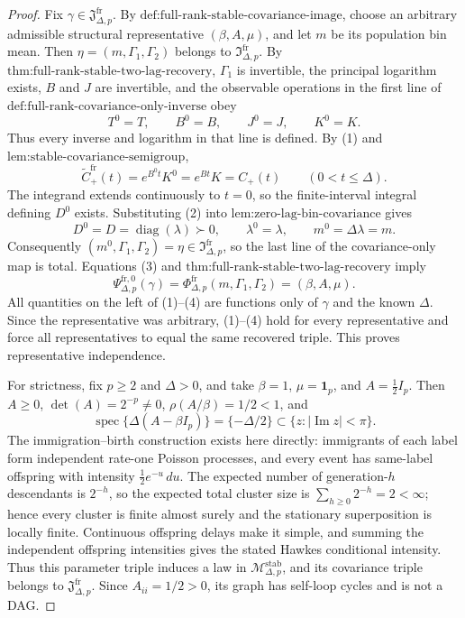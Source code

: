 \documentclass{article}
\begin{document}
\begin{proof}
Fix \(\gamma\in\mathfrak J_{\Delta,p}^{\mathrm{fr}}\).  By \(\text{def:full-rank-stable-covariance-image}\), choose an arbitrary admissible structural representative \((\beta,A,\mu)\), and let \(m\) be its population bin mean.  Then \(\eta=(m,\Gamma_1,\Gamma_2)\) belongs to \(\mathfrak I_{\Delta,p}^{\mathrm{fr}}\).  By \(\text{thm:full-rank-stable-two-lag-recovery}\), \(\Gamma_1\) is invertible, the principal logarithm exists, \(B\) and \(J\) are invertible, and the observable operations in the first line of \(\text{def:full-rank-covariance-only-inverse}\) obey
\[
 T^0=T,\qquad B^0=B,\qquad J^0=J,\qquad K^0=K.
\tag{1}
\]
Thus every inverse and logarithm in that line is defined.  By (1) and \(\text{lem:stable-covariance-semigroup}\),
\[
 \widetilde C_{+}^{\mathrm{fr}}(t)=e^{B^0t}K^0=e^{Bt}K=C_{+}(t)
 \qquad(0<t\leq\Delta).
\tag{2}
\]
The integrand extends continuously to \(t=0\), so the finite-interval integral defining \(D^0\) exists.  Substituting (2) into \(\text{lem:zero-lag-bin-covariance}\) gives
\[
 D^0=D=\operatorname{diag}(\lambda)\succ0,\qquad
 \lambda^0=\lambda,\qquad m^0=\Delta\lambda=m.
\tag{3}
\]
Consequently \((m^0,\Gamma_1,\Gamma_2)=\eta\in\mathfrak I_{\Delta,p}^{\mathrm{fr}}\), so the last line of the covariance-only map is total.  Equations (3) and \(\text{thm:full-rank-stable-two-lag-recovery}\) imply
\[
 \Psi_{\Delta,p}^{\mathrm{fr},0}(\gamma)
 =\Phi_{\Delta,p}^{\mathrm{fr}}(m,\Gamma_1,\Gamma_2)
 =(\beta,A,\mu).
\tag{4}
\]
All quantities on the left of (1)--(4) are functions only of \(\gamma\) and the known \(\Delta\).  Since the representative was arbitrary, (1)--(4) hold for every representative and force all representatives to equal the same recovered triple.  This proves representative independence.

For strictness, fix \(p\geq2\) and \(\Delta>0\), and take \(\beta=1\), \(\mu=\mathbf 1_p\), and \(A=\tfrac12 I_p\).  Then \(A\geq0\), \(\det(A)=2^{-p}\neq0\), \(\rho(A/\beta)=1/2<1\), and
\[
 \operatorname{spec}\{\Delta(A-\beta I_p)\}=\{-\Delta/2\}
 \subset\{z:|\operatorname{Im}z|<\pi\}.
\tag{5}
\]
The immigration--birth construction exists here directly: immigrants of each label form independent rate-one Poisson processes, and every event has same-label offspring with intensity \(\tfrac12e^{-u}\,du\).  The expected number of generation-\(h\) descendants is \(2^{-h}\), so the expected total cluster size is \(\sum_{h\geq0}2^{-h}=2<\infty\); hence every cluster is finite almost surely and the stationary superposition is locally finite.  Continuous offspring delays make it simple, and summing the independent offspring intensities gives the stated Hawkes conditional intensity.  Thus this parameter triple induces a law in \(\mathcal M_{\Delta,p}^{\mathrm{stab}}\), and its covariance triple belongs to \(\mathfrak J_{\Delta,p}^{\mathrm{fr}}\).  Since \(A_{ii}=1/2>0\), its graph has self-loop cycles and is not a DAG.
\end{proof}
\end{document}
